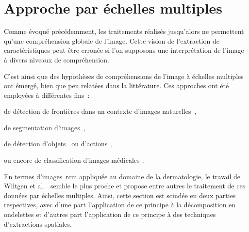 \section{Approche par échelles multiples}
Comme évoqué précédemment, les traitements réalisés jusqu'alors ne permettent qu'une compréhension globale de l'image. Cette vision de l'extraction de caractéristiques peut être erronée si l'on supposons une interprétation de l'image à divers niveaux de compréhension.\par

C'est ainsi que des hypothèses de compréhensions de l'image à échelles multiples ont émergé, bien que peu relatées dans la littérature. Ces approches ont été employées à différentes fins~: 
\begin{inlinerate}
    \item de détection de frontières dans un contexte d'images naturelles~\cite{Ren2008},
    \item de segmentation d'images~\cite{Santos2012,Arbelaez2014},
    \item de détection d'objets~\cite{Felzenszwalb2008} ou d'actions~\cite{Pedersoli2011},
    \item ou encore de classification d'images médicales~\cite{Alsaih2016,Tang2017}.
\end{inlinerate} En termes d'images~\gls{rcm} appliquée au domaine de la dermatologie, le travail de Wiltgen et al.~\cite{Wiltgen2008} semble le plus proche et propose entre autres le traitement de ces données par échelles multiples. Ainsi, cette section est scindée en deux parties respectives, avec d'une part l'application de ce principe à la décomposition en ondelettes et d'autres part l'application de ce principe à des techniques d'extractions spatiales.\par 

